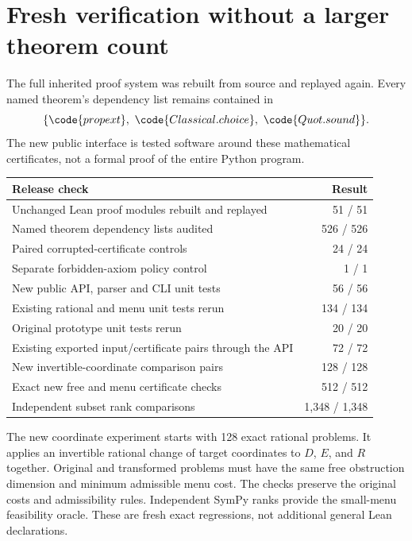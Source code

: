 \section{Fresh verification without a larger theorem count}

The full inherited proof system was rebuilt from source and replayed again. Every named theorem's dependency list remains contained in
\[
\{\code{propext},\ \code{Classical.choice},\ \code{Quot.sound}\}.
\]
The new public interface is tested software around these mathematical certificates, not a formal proof of the entire Python program.

\begin{center}
\small
\begin{tabularx}{\textwidth}{@{}Xr@{}}
\toprule
Release check & Result\\
\midrule
Unchanged Lean proof modules rebuilt and replayed & 51 / 51\\
Named theorem dependency lists audited & 526 / 526\\
Paired corrupted-certificate controls & 24 / 24\\
Separate forbidden-axiom policy control & 1 / 1\\
New public API, parser and CLI unit tests & 56 / 56\\
Existing rational and menu unit tests rerun & 134 / 134\\
Original prototype unit tests rerun & 20 / 20\\
Existing exported input/certificate pairs through the API & 72 / 72\\
New invertible-coordinate comparison pairs & 128 / 128\\
Exact new free and menu certificate checks & 512 / 512\\
Independent subset rank comparisons & 1,348 / 1,348\\
\bottomrule
\end{tabularx}
\end{center}

The new coordinate experiment starts with 128 exact rational problems. It applies an invertible rational change of target coordinates to $D$, $E$, and $R$ together. Original and transformed problems must have the same free obstruction dimension and minimum admissible menu cost. The checks preserve the original costs and admissibility rules. Independent SymPy ranks provide the small-menu feasibility oracle. These are fresh exact regressions, not additional general Lean declarations.

